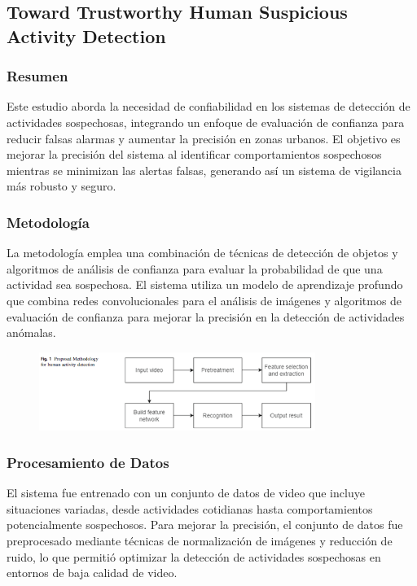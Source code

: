 \subsection{Toward Trustworthy Human Suspicious Activity Detection}

\subsubsection{Resumen}
Este estudio aborda la necesidad de confiabilidad en los sistemas de detección de actividades sospechosas, integrando un enfoque de evaluación de confianza para reducir falsas alarmas y aumentar la precisión en zonas urbanos. El objetivo es mejorar la precisión del sistema al identificar comportamientos sospechosos mientras se minimizan las alertas falsas, generando así un sistema de vigilancia más robusto y seguro.

\subsubsection{Metodología}
La metodología emplea una combinación de técnicas de detección de objetos y algoritmos de análisis de confianza para evaluar la probabilidad de que una actividad sea sospechosa. El sistema utiliza un modelo de aprendizaje profundo que combina redes convolucionales para el análisis de imágenes y algoritmos de evaluación de confianza para mejorar la precisión en la detección de actividades anómalas.

\begin{figure}[h] %
    \centering
    \includegraphics[width=0.8\textwidth]{4/met3.png} %
    \label{fig:ejemplo} %
\end{figure}


\subsubsection{Procesamiento de Datos}
El sistema fue entrenado con un conjunto de datos de video que incluye situaciones variadas, desde actividades cotidianas hasta comportamientos potencialmente sospechosos. Para mejorar la precisión, el conjunto de datos fue preprocesado mediante técnicas de normalización de imágenes y reducción de ruido, lo que permitió optimizar la detección de actividades sospechosas en entornos de baja calidad de video.

